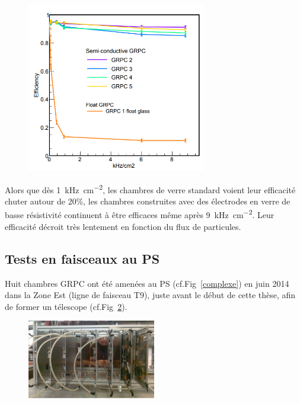 \begin{figure}[ht!]
	\centering
	\includegraphics[width=0.7\textwidth]{GLA/effiDesy.png}
	\label{effiDesy}
\end{figure}

Alors que dès \SI{1}{\kilo\hertz\per\square\centi\meter}, les chambres de verre standard voient leur efficacité chuter autour de \num{20}\%, les chambres construites avec des électrodes en verre de basse résistivité continuent à être efficaces même après \SI{9}{\kilo\hertz\per\square\centi\meter}. Leur efficacité décroit très lentement en fonction du flux de particules.

\subsection{Tests en faisceaux au PS}
\label{PSS}
Huit chambres GRPC ont été amenées au PS (cf.Fig~\ref{complexe}) en juin \num{2014} dans la Zone Est (ligne de faisceau T9), juste avant le début de cette thèse, afin de former un télescope (cf.Fig~\ref{TelescopePS}).

\begin{figure}[ht!]
	\centering
	\includegraphics[width=0.50\textwidth]{GLA/TelescopePS.png}
	\label{TelescopePS}
\end{figure}

